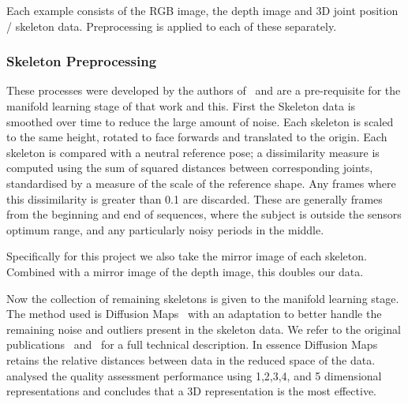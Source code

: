\documentclass[11pt]{article} %
\begin{document}
Each example consists of the RGB image, the depth image and 3D joint position / skeleton data. Preprocessing is applied to each of these separately.

\subsubsection{Skeleton Preprocessing}

These processes were developed by the authors of~\cite{Paiement} and are a pre-requisite for the manifold learning stage of that work and this. First the Skeleton data is smoothed over time to reduce the large amount of noise. Each skeleton is scaled to the same height, rotated to face forwards and translated to the origin. Each skeleton is compared with a neutral reference pose;  a dissimilarity measure is computed  using the sum of squared distances between corresponding joints, standardised by a measure of the scale of the reference shape. Any frames where this dissimilarity is greater than 0.1 are discarded. These are generally frames from the beginning and end of sequences, where the subject is outside the sensors optimum range, and any particularly noisy periods in the middle. 

Specifically for this project we also take the mirror image of each skeleton. Combined with a mirror image of the depth image, this doubles our data. 

Now the collection of remaining skeletons is given to the manifold learning stage. The method used is Diffusion Maps~\cite{Coifman2006} with an adaptation to better handle the remaining noise and outliers present in the skeleton data. We refer to the original publications~\cite{Paiement} and~\cite{Tao} for a full technical description. In essence Diffusion Maps retains the relative distances between data in the reduced space of the data. \cite{Tao} analysed the quality assessment performance using 1,2,3,4, and 5 dimensional representations and concludes that a 3D representation is the most effective.
\end{document}
